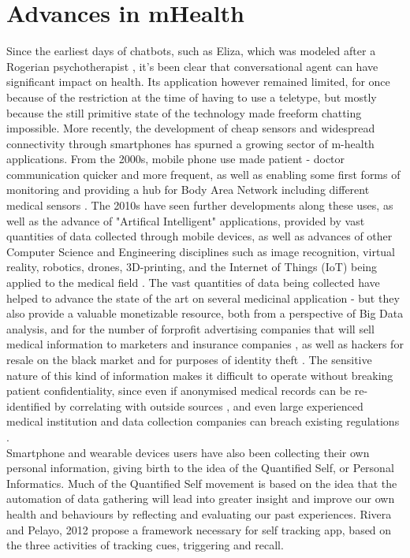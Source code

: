 \section{Advances in mHealth}
Since the earliest days of chatbots, such as Eliza, which was modeled after a Rogerian psychotherapist \cite{weizenbaum1966eliza}, it's been clear that conversational agent can have significant impact on health. Its application however remained limited, for once because of the restriction at the time of having to use a teletype, but mostly because the still primitive state of the technology made freeform chatting impossible. More recently, the development of cheap sensors and widespread connectivity through smartphones has spurned a growing sector of m-health applications. From the 2000s, mobile phone use made patient - doctor communication quicker and more frequent, as well as enabling some first forms of monitoring and providing a hub for Body Area Network including different medical sensors \cite{Patrick2008}. The 2010s have seen further developments along these uses, as well as the advance of "Artifical Intelligent" applications, provided by vast quantities of data collected through mobile devices, as well as advances of other Computer Science and Engineering disciplines such as image recognition, virtual reality, robotics, drones, 3D-printing, and the Internet of Things (IoT) being applied to the medical field \cite{Pistorius2017}. The vast quantities of data being collected have helped to advance the state of the art on several medicinal application - but they also provide a valuable monetizable resource, both from a perspective of Big Data analysis, and for the number of forprofit advertising companies that will sell medical information to marketers and insurance companies \cite{tanner2016}, as well as hackers for resale on the black market and for purposes of identity theft \cite{hackercare}. The sensitive nature of this kind of information makes it difficult to operate without breaking patient confidentiality, since even if anonymised medical records can be re-identified by correlating with outside sources \cite{Sweeney2001}, and even large experienced medical institution and data collection companies can breach existing regulations \cite{deepmindnhs}. \\
Smartphone and wearable devices users have also been collecting their own personal information, giving birth to the idea of the Quantified Self, or Personal Informatics.
Much of the Quantified Self movement is based on the idea that the automation of data gathering will lead into greater insight and improve our own health and behaviours by reflecting and evaluating our past experiences. Rivera and Pelayo, 2012 \cite{Rivera-Pelayo2012} propose a framework necessary for self tracking app, based on the three activities of tracking cues, triggering and recall.
